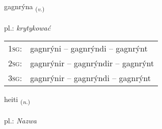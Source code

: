 \documentclass[frontgrid, backgrid]{flacards}\usepackage[]{graphicx}\usepackage[]{xcolor}
\begin{document}
\renewcommand{\flhead}{\vskip5pt \fboxsep=0pt {\small\bfseries\footnotesize Sagnorð | Verb}}
\renewcommand{\fcfoot}{\vskip5pt \fboxsep=0pt \hspace{2pt}{\small\bfseries\footnotesize 2K}}

\renewcommand{\blhead}{\vskip5pt {\small\bfseries\footnotesize Sagnorð | Verb }}
\renewcommand{\bcfoot}{\vskip5pt \hspace{2pt}{\small\bfseries\footnotesize 2K}}


{gagnrýna \small{\textsubscript{(\textit{v.})}} \\[1ex] %
\textphonetic{[kakrina]} \\
pl.: \emph{krytykować} \\  [2ex]
\renewcommand*{\arraystretch}{0.8}
\begin{tabular}{p{1cm}l}
\textsc{1sg}: & gagnrýni -- gagnrýndi -- gagnrýnt \\ 
\textsc{2sg}: & gagnrýnir -- gagnrýndir -- gagnrýnt \\ 
\textsc{3sg}: & gagnrýnir -- gagnrýndi -- gagnrýnt \\ 
\end{tabular}
}

\renewcommand{\flhead}{\vskip5pt \fboxsep=0pt {\small\bfseries\footnotesize Nafnorð | Noun}}
\renewcommand{\fcfoot}{\vskip5pt \fboxsep=0pt \hspace{2pt}{\small\bfseries\footnotesize 2K}}

\renewcommand{\blhead}{\vskip5pt {\small\bfseries\footnotesize Nafnorð | Noun }}
\renewcommand{\bcfoot}{\vskip5pt \hspace{2pt}{\small\bfseries\footnotesize 2K}}


{heiti \small{\textsubscript{(\textit{n.})}} \\[1ex] %
\textphonetic{[heiːtɪ]} \\
pl.: \emph{Nazwa} \\  [2ex]
\renewcommand*{\arraystretch}{0.8}
}
\end{document}
